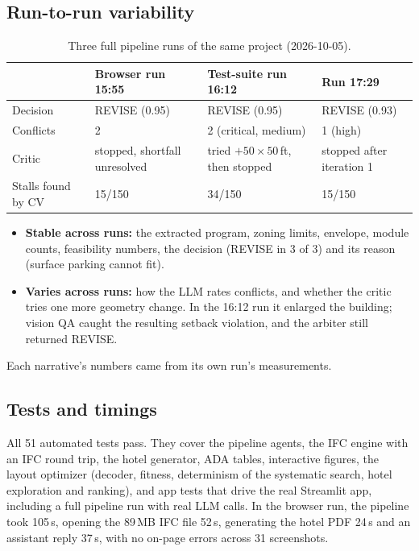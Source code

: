 \documentclass[10pt,a4paper]{article}
\theoremstyle{definition}
\begin{document}
\subsection{Run-to-run variability}
\label{sec:variability}
\begin{table}[H]
\centering\small
\caption{Three full pipeline runs of the same project (2026-10-05).}
\begin{tabular}{@{}l l l l@{}}
\toprule
 & \textbf{Browser run 15:55} & \textbf{Test-suite run 16:12} & \textbf{Run 17:29} \\ \midrule
Decision & REVISE (0.95) & REVISE (0.95) & REVISE (0.93) \\
Conflicts & 2 & 2 (critical, medium) & 1 (high) \\
Critic & stopped, shortfall unresolved & tried $+50\times50$\,ft, then stopped & stopped after iteration 1 \\
Stalls found by CV & 15/150 & 34/150 & 15/150 \\
\bottomrule
\end{tabular}
\end{table}

\begin{itemize}
\item \textbf{Stable across runs:} the extracted program, zoning limits, envelope, module counts, feasibility numbers,
the decision (REVISE in 3 of 3) and its reason (surface parking cannot fit).
\item \textbf{Varies across runs:} how the LLM rates conflicts, and whether the critic tries one more geometry change.
In the 16:12 run it enlarged the building; vision QA caught the resulting setback violation, and the arbiter still
returned REVISE.
\end{itemize}
Each narrative's numbers came from its own run's measurements.

\subsection{Tests and timings}
All 51 automated tests pass. They cover the pipeline agents, the IFC engine with an IFC round trip, the hotel
generator, ADA tables, interactive figures, the layout optimizer (decoder, fitness, determinism of the systematic
search, hotel exploration and ranking), and app tests that drive the real Streamlit app, including a full pipeline
run with real LLM calls. In the browser run, the pipeline took 105\,s, opening the 89\,MB IFC file 52\,s, generating
the hotel PDF 24\,s and an assistant reply 37\,s, with no on-page errors across 31 screenshots.
\end{document}
